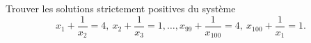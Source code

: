 Trouver les solutions strictement positives du système
\[ x_1 + \frac{1}{x_2} = 4,\ x_2 + \frac{1}{x_3} = 1, \ldots, x_{99} + \frac{1}{x_{100}} = 4,\ x_{100} + \frac{1}{x_1} = 1. \]
